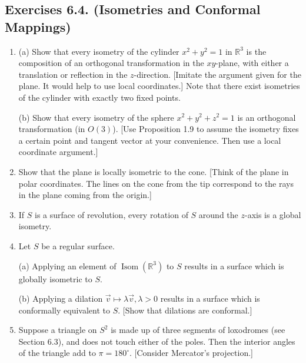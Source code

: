 \documentclass[leqno]{book}
\begin{document}
\subsection*{Exercises 6.4. (Isometries and Conformal Mappings)} %
\begin{enumerate}
\item (a) Show that every isometry of the cylinder $x^2+y^2=1$ in $\mathbb R^3$ is the composition of an orthogonal transformation in the $xy$-plane, with either a translation or reflection in the $z$-direction.  [Imitate the argument given for the plane.  It would help to use local coordinates.]  Note that there exist isometries of the cylinder with exactly two fixed points. %

(b) Show that every isometry of the sphere $x^2+y^2+z^2=1$ is an orthogonal transformation (in $O(3)$).  [Use Proposition 1.9 to assume the isometry fixes a certain point and tangent vector at your convenience.  Then use a local coordinate argument.]

\item Show that the plane is locally isometric to the cone.  [Think of the plane in polar coordinates.  The lines on the cone from the tip correspond to the rays in the plane coming from the origin.]

\item If $S$ is a surface of revolution, every rotation of $S$ around the $z$-axis is a global isometry.

\item Let $S$ be a regular surface.

(a) Applying an element of $\operatorname{Isom}(\mathbb R^3)$ to $S$ results in a surface which is globally isometric to $S$.

(b) Applying a dilation $\vec v\mapsto\lambda\vec v,\lambda>0$ results in a surface which is conformally equivalent to $S$.  [Show that dilations are conformal.]

\item Suppose a triangle on $S^2$ is made up of three segments of loxodromes (see Section 6.3), and does not touch either of the poles.  Then the interior angles of the triangle add to $\pi=180^\circ$.  [Consider Mercator's projection.]


\end{enumerate}
\end{document}

